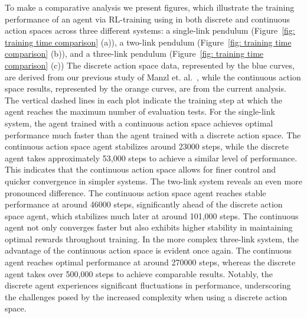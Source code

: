 To make a comparative analysis we present figures, which illustrate the training performance of an agent via RL-training using in both discrete and continuous action spaces across three different systems: a single-link pendulum (Figure~\ref{fig: training time comparison} (a)), a two-link pendulum (Figure~\ref{fig: training time comparison} (b)), and a three-link pendulum (Figure~\ref{fig: training time comparison} (c)) The discrete action space data, represented by the blue curves, are derived from our previous study of Manzl et. al.~\cite{manzl2023relrl}, while the continuous action space results, represented by the orange curves, are from the current analysis. The vertical dashed lines in each plot indicate the training step at which the agent reaches the maximum number of evaluation tests.
For the single-link system, the agent trained with a continuous action space achieves optimal performance much faster than the agent trained with a discrete action space. The continuous action space agent stabilizes around 23000 steps, while the discrete agent takes approximately 53,000 steps to achieve a similar level of performance. This indicates that the continuous action space allows for finer control and quicker convergence in simpler systems. The two-link system reveals an even more pronounced difference. The continuous action space agent reaches stable performance at around 46000 steps, significantly ahead of the discrete action space agent, which stabilizes much later at around 101,000 steps. The continuous agent not only converges faster but also exhibits higher stability in maintaining optimal rewards throughout training. In the more complex three-link system, the advantage of the continuous action space is evident once again. The continuous agent reaches optimal performance at around 270000 steps, whereas the discrete agent takes over 500,000 steps to achieve comparable results. Notably, the discrete agent experiences significant fluctuations in performance, underscoring the challenges posed by the increased complexity when using a discrete action space.

